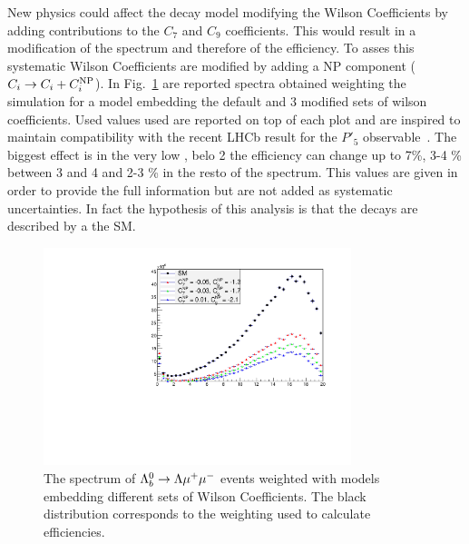 New physics could affect the decay model modifying the Wilson Coefficients by adding
contributions to the $C_7$ and $C_9$ coefficients. This would result in a modification
of the \qsq spectrum and therefore of the efficiency.
To asses this systematic Wilson Coefficients are modified by adding a NP component
($C_i \rightarrow C_i + C_i^{ \rm NP}$). In Fig.~\ref{fig:wilson_q2} are reported \qsq spectra
obtained weighting the simulation for a model embedding the default and 3 modified sets
of wilson coefficients. Used values used are reported on top of each plot and are inspired
to maintain compatibility with the recent LHCb result for the $P'_5$ observable~\cite{Descotes-Genon:2013wba}.
The biggest effect is in the very low \qsq, belo 2 \gevgevcccc the efficiency can change
up to 7\%, 3-4 \% between 3 and 4 \gevgevcccc and 2-3 \% in the resto of the spectrum.
This values are given in order to provide the full information but are not added as systematic
uncertainties. In fact the hypothesis of this analysis is that the decays are described
by a the SM.

\begin{figure}
\centering
\includegraphics[width=0.8\textwidth]{Lmumu/figs/wilson_q2.pdf}
\caption{The \qsq spectrum of $\Lambda^0_b\rightarrow\Lambda\mu^+\mu^-$ events weighted with models embedding different sets of Wilson Coefficients.
The black distribution corresponds to the weighting used to calculate efficiencies.}
\label{fig:wilson_q2}
\end{figure}


